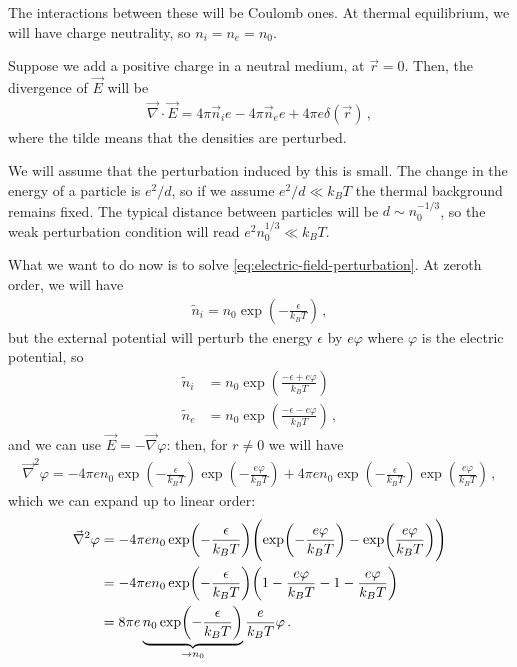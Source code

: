 \documentclass[main.tex]{subfiles}
\begin{document}
The interactions between these will be Coulomb ones. 
At thermal equilibrium, we will have charge neutrality, so \(n_i = n_e = n_0\). 

Suppose we add a positive charge in a neutral medium, at \(\vec{r} = 0\). 
Then, the divergence of \(\vec{E}\) will be 
%
\begin{align} \label{eq:electric-field-perturbation}
\vec{\nabla} \cdot \vec{E} = 4 \pi \vec{n}_i e - 4 \pi \vec{n}_e e + 4 \pi e \delta (\vec{r})
\,,
\end{align}
%
where the tilde means that the densities are perturbed. 

We will assume that the perturbation induced by this is small. The change in the energy of a particle is \(e^2 / d\), so if we assume \(e^2 / d \ll k_B T\) the thermal background remains fixed. 
The typical distance between particles will be \(d \sim n_0^{-1/3}\), so the weak perturbation condition will read \(e^2 n_0^{1/3} \ll k_B T\). 

What we want to do now is to solve \eqref{eq:electric-field-perturbation}. 
At zeroth order, we will have 
%
\begin{align}
\widetilde{n}_i = n_0 \exp(- \frac{\epsilon}{k_B T})
\,,
\end{align}
%
but the external potential will perturb the energy \(\epsilon \) by \(e \varphi \) where \(\varphi \) is the electric potential, so 
%
\begin{subequations}
\begin{align}
\widetilde{n}_i &= n_0 \exp(\frac{- \epsilon + e \varphi }{k_B T})  \\
\widetilde{n}_e &= n_0 \exp(\frac{- \epsilon - e \varphi }{k_B T})
\,,
\end{align}
\end{subequations}
%
and we can use \(\vec{E} = - \vec{\nabla} \varphi \): then, for \(r \neq 0\) we will have
%
\begin{align}
\vec{\nabla}^2 \varphi = 
- 4 \pi e n_0 \exp(- \frac{\epsilon }{k_B T}) 
\exp( - \frac{e \varphi }{k_B T})
+ 4 \pi e n_0 \exp(- \frac{\epsilon }{k_B T}) \exp( \frac{e \varphi }{k_B T})
\,,
\end{align}
%
which we can expand up to linear order: 
%
\begin{subequations}
\begin{align}
\vec{\nabla}^2 \varphi &= 
- 4 \pi e n_0 \exp(- \frac{\epsilon }{k_B T}) 
\qty( \exp(- \frac{e \varphi }{k_B T}) - \exp(\frac{e \varphi }{k_B T}))  \\
&= 
- 4 \pi e n_0 \exp(- \frac{\epsilon }{k_B T}) 
\qty(1 - \frac{e \varphi }{k_BT} - 1 - \frac{e \varphi }{k_B T})  \\
&=
8 \pi e \underbrace{n_0 \exp(- \frac{\epsilon }{k_B T})}_{ \to n_0 } 
\frac{e }{k_B T} \varphi
\,.
\end{align}
\end{subequations}
\end{document}
